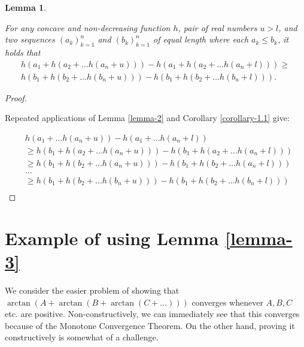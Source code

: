 \documentclass[
]{article}
\theoremstyle{theorem}
\theoremstyle{lemma}
\newtheorem{lemma}{Lemma}
\theoremstyle{corollary}
\theoremstyle{remark}
\theoremstyle{definition}
\begin{document}
\begin{lemma}
\hypertarget{lemma-3}{%
\label{lemma-3}}


For any concave and non-decreasing function \(h\), pair of real numbers \(u > l\), and two sequences \((a_k)_{k=1}^n\) and \((b_k)_{k=1}^n\) of equal length where each \(a_k \leq b_k\), it holds that \[\begin{aligned}
h(a_1 + h(a_2 + \dots h(a_n + u))) - h(a_1 + h(a_2 + \dots h(a_n + l))) \geq
\\ h(b_1 + h(b_2 + \dots h(b_n + u))) - h(b_1 + h(b_2 + \dots h(b_n + l))).
\end{aligned}\]

\end{lemma}
\begin{proof}

\hypertarget{proof-3}{%
\label{proof-3}}
Repeated applications of Lemma \ref{lemma-2} and Corollary \ref{corollary-1.1} give:

\[\begin{aligned}
&h(a_1 + \dots h(a_n + u)) - h(a_1 + \dots h(a_n + l))\\
&\geq h(b_1 + h(a_2 + \dots h(a_n + u))) - h(b_1 + h(a_2 + \dots h(a_n + l)))\\
&\geq h(b_1 + h(b_2 + \dots h(a_n + u))) - h(b_1 + h(b_2 + \dots h(a_n + l)))\\
&\dots\\
&\geq h(b_1 + h(b_2 + \dots h(b_n + u))) - h(b_1 + h(b_2 + \dots h(b_n + l)))\\
\end{aligned}\]

\end{proof}
\hypertarget{example-of-using-lemma-3}{%
\section{Example of using Lemma \ref{lemma-3}}\label{example-of-using-lemma-3}}

We consider the easier problem of showing that \(\arctan(A + \arctan(B + \arctan(C + \dotsc)))\) converges whenever \(A, B, C\) etc. are positive. Non-constructively, we can immediately see that this converges because of the Monotone Convergence Theorem. On the other hand, proving it constructively is somewhat of a challenge.
\end{document}
